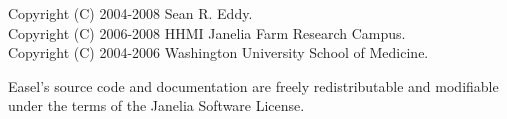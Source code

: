 \vspace*{\fill}
\begin{flushleft}
Copyright (C) 2004-2008 Sean R. Eddy.\\
Copyright (C) 2006-2008 HHMI Janelia Farm Research Campus.\\
Copyright (C) 2004-2006 Washington University School of Medicine.\\
\end{flushleft}

\vspace{2em} 

Easel's source code and documentation are freely redistributable and
modifiable under the terms of the Janelia Software License.








